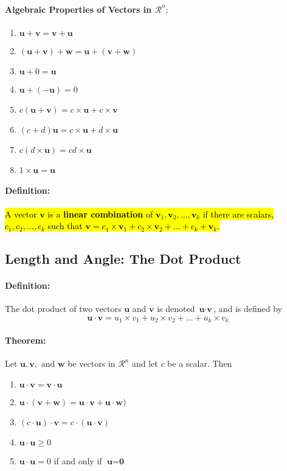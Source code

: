 \documentclass[12pt]{article}
\newenvironment{theorem}{\paragraph{Theorem:\hfill}}{\hfill}
\newenvironment{definition}{\paragraph{Definition: }}{\hfill}
\begin{document}
\paragraph{Algebraic Properties of Vectors in $\mathcal{R}^n;$}
\begin{enumerate}
	\item $\textbf{u} + \textbf{v} = \textbf{v} + \textbf{u}$
	\item $(\textbf{u} + \textbf{v}) + \textbf{w} = \textbf{u} + (\textbf{v} + \textbf{w})$
	\item $\textbf{u} + 0 = \textbf{u}$
	\item $\textbf{u} + (-\textbf{u}) = 0$
	\item $c(\textbf{u} + \textbf{v}) = c \times \textbf{u} + c \times \textbf{v}$
	\item $(c + d)\textbf{u} = c \times \textbf{u} + d \times \textbf{u}$
	\item $c(d \times \textbf{u}) = cd \times \textbf{u}$
	\item $1 \times \textbf{u} = \textbf{u}$
\end{enumerate}

\begin{definition}
	\hl{A vector $\textbf{v}$ is a \textbf{linear combination} of $\textbf{v}_1, \textbf{v}_2, \dots, \textbf{v}_k$ if there are scalars, $c_1, c_2, \dots, c_k$ such that $\textbf{v} = c_1 \times \textbf{v}_1 + c_2 \times \textbf{v}_2 + \dots + c_k + \textbf{v}_k$.}
\end{definition}

\newpage

\subsection{Length and Angle: The Dot Product}


\begin{definition}
	The dot product of two vectors $\textbf{u}$ and  $\textbf{v}$ is denoted  $\textbf{u} \cdot \textbf{v}$, and is defined by
	\[
		\textbf{u} \cdot \textbf{v} = u_1 \times v_1 +  u_2 \times v_2 + \dots +  u_k \times v_k
	\]
\end{definition}

\begin{theorem}
	Let $\textbf{u}, \textbf{v},$ and $\textbf{w}$ be vectors in $\mathcal{R}^n$ and let $c$ be a scalar. Then
	
	\begin{enumerate}
		\item $\textbf{u} \cdot \textbf{v} = \textbf{v} \cdot \textbf{u}$
		\item $\textbf{u} \cdot ( \textbf{v} + \textbf{w} ) = \textbf{u} \cdot \textbf{v} + \textbf{u} \cdot \textbf{w})$
		\item $(c \cdot \textbf{u}) \cdot \textbf{v} =c \cdot (\textbf{u} \cdot \textbf{v})$
		\item $\textbf{u} \cdot \textbf{u} \geq 0$
		\item $\textbf{u} \cdot \textbf{u} = 0$ if and only if $\textbf{u} = \textbf{0}$
	\end{enumerate}
\end{theorem}
\end{document}
